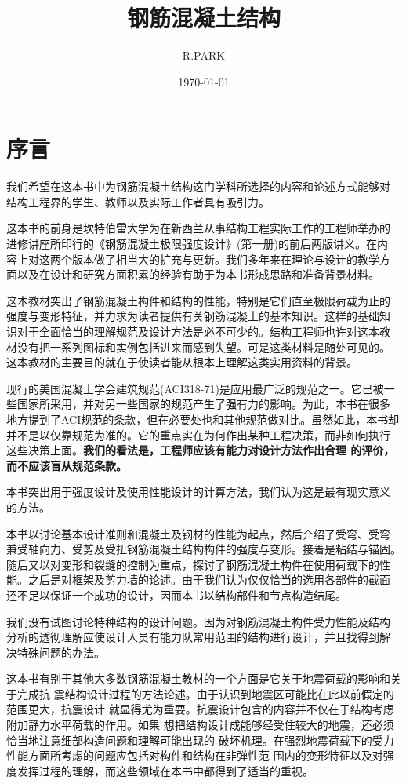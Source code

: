 \documentclass[12pt,a4paper]{book}
\title{}
\author{R.PARK}
\date{\today}
\title{钢筋混凝土结构}
\begin{document}
\maketitle

\chapter*{序言}

我们希望在这本书中为钢筋混凝土结构这门学科所选择的内容和论述方式能够对
结构工程界的学生、教师以及实际工作者具有吸引力。

这本书的前身是坎特伯雷大学为在新西兰从事结构工程实际工作的工程师举办的
进修讲座所印行的《钢筋混凝土极限强度设计》(第一册)的前后两版讲义。在内
容上对这两个版本做了相当大的扩充与更新。我们多年来在理论与设计的教学方
面以及在设计和研究方面积累的经验有助于为本书形成思路和准备背景材料。

这本教材突出了钢筋混凝土构件和结构的性能，特别是它们直至极限荷载为止的
强度与变形特征，并力求为读者提供有关钢筋混凝土的基本知识。这样的基础知
识对于全面恰当的理解规范及设计方法是必不可少的。结构工程师也许对这本教
材没有把一系列图标和实例包括进来而感到失望。可是这类材料是随处可见的。
这本教材的主要目的就在于使读者能从根本上理解这类实用资料的背景。

现行的美国混凝土学会建筑规范(ACI318-71)是应用最广泛的规范之一。它已被一
些国家所采用，并对另一些国家的规范产生了强有力的影响。为此，本书在很多
地方提到了ACI规范的条款，但在必要处也和其他规范做对比。虽然如此，本书却
并不是以仅靠规范为准的。它的重点实在为何作出某种工程决策，而非如何执行
这些决策上面。\textbf{我们的看法是，工程师应该有能力对设计方法作出合理
  的评价，而不应该盲从规范条款。}

本书突出用于强度设计及使用性能设计的计算方法，我们认为这是最有现实意义
的方法。

本书以讨论基本设计准则和混凝土及钢材的性能为起点，然后介绍了受弯、受弯
兼受轴向力、受剪及受扭钢筋混凝土结构构件的强度与变形。接着是粘结与锚固。
随后又以对变形和裂缝的控制为重点，探讨了钢筋混凝土构件在使用荷载下的性
能。之后是对框架及剪力墙的论述。由于我们认为仅仅恰当的选用各部件的截面
还不足以保证一个成功的设计，因而本书以结构部件和节点构造结尾。

我们没有试图讨论特种结构的设计问题。因为对钢筋混凝土构件受力性能及结构
分析的透彻理解应使设计人员有能力队常用范围的结构进行设计，并且找得到解
决特殊问题的办法。

这本书有别于其他大多数钢筋混凝土教材的一个方面是它关于地震荷载的影响和关于完成抗
震结构设计过程的方法论述。由于认识到地震区可能比在此以前假定的范围更大，抗震设计
就显得尤为重要。抗震设计包含的内容并不仅在于结构考虑附加静力水平荷载的作用。如果
想把结构设计成能够经受住较大的地震，还必须恰当地注意细部构造问题和理解可能出现的
破坏机理。在强烈地震荷载下的受力性能方面所考虑的问题应包括对构件和结构在非弹性范
围内的变形特征以及对强度发挥过程的理解，而这些领域在本书中都得到了适当的重视。
\end{document}
